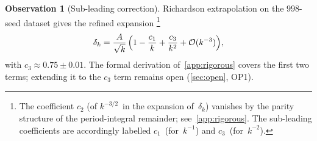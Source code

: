 \documentclass[11pt,a4paper]{article}
\theoremstyle{plain}
\theoremstyle{definition}
\newtheorem{observation}[theorem]{Observation}
\theoremstyle{remark}
\newcommand{\Oo}{\mathcal{O}}
\begin{document}
\begin{observation}[Sub-leading correction]\label{obs:c3}
  Richardson extrapolation on the $998$-seed dataset gives
  the refined expansion%
  \footnote{The coefficient $c_2$ (of $k^{-3/2}$~in the expansion
    of~$\delta_k$) vanishes by the parity structure of the
    period-integral remainder; see~\cref{app:rigorous}.
    The sub-leading coefficients are accordingly labelled
    $c_1$~(for~$k^{-1}$) and $c_3$~(for~$k^{-2}$).}
  \begin{equation}
    \delta_k = \frac{A}{\sqrt{k}}\,
      \Bigl(1 - \frac{c_1}{k} + \frac{c_3}{k^2}
      + \Oo(k^{-3})\Bigr),
    \label{eq:asymptotic-refined}
  \end{equation}
  with $c_3 \approx 0.75 \pm 0.01$.
  The formal derivation of~\cref{app:rigorous} covers
  the first two terms; extending it to the $c_3$ term
  remains open (\cref{sec:open}, OP1).
\end{observation}
\end{document}

